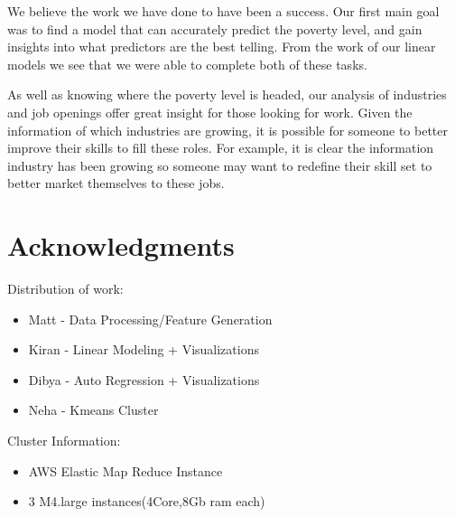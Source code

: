 \documentclass[11pt,letterpaper]{article}
\begin{document}
We believe the work we have done to have been a success. Our first main goal was to find a model that can accurately predict the poverty level, and gain insights into what predictors are the best telling. From the work of our linear models we see that we were able to complete both of these tasks. 

As well as knowing where the poverty level is headed, our analysis of industries and job openings offer great insight for those looking for work. Given the information of which industries are growing, it is possible for someone to better improve their skills to fill these roles. For example, it is clear the information industry has been growing so someone may want to redefine their skill set to better market themselves to these jobs. 

\section*{Acknowledgments}
Distribution of work:
\begin{itemize}
	\item {Matt - Data Processing/Feature Generation}
	\item {Kiran - Linear Modeling + Visualizations}
	\item {Dibya - Auto Regression + Visualizations}
	\item {Neha - Kmeans Cluster}
\end{itemize}

Cluster Information:
\begin{itemize}
	\item{AWS Elastic Map Reduce Instance}
	\item{3 M4.large instances(4Core,8Gb ram each)}
\end{itemize}



\end{document}
